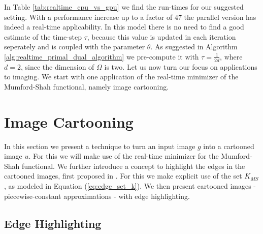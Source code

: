 \documentclass[abstracton]{scrreprt}
\begin{document}
        In Table \ref{tab:realtime_cpu_vs_gpu} we find the run-times for our suggested setting. With a performance increase up to a factor of $47$ the parallel version has indeed a real-time applicability. In this model there is no need to find a good estimate of the time-step $\tau$, because this value is updated in each iteration seperately and is coupled with the parameter $\theta$. As suggested in Algorithm \ref{alg:realtime_primal_dual_algorithm} we pre-compute it with $\tau = \frac{1}{2d}$, where $d = 2$, since the dimension of $\Omega$ is two. Let us now turn our focus on applications to imaging. We start with one application of the real-time minimizer of the Mumford-Shah functional, namely image cartooning.



    \section{Image Cartooning} %
    \label{sec:image_cartooning}
        
        In this section we present a technique to turn an input image $g$ into a cartooned image $u$. For this we will make use of the real-time minimizer for the Mumford-Shah functional. We further introduce a concept to highlight the edges in the cartooned images, first proposed in \cite{Strekalovskiy-Cremers-eccv14}. For this we make explicit use of the set $K_{MS}$, as modeled in Equation (\ref{eq:edge_set_k}). We then present cartooned images - piecewise-constant approximations - with edge highlighting.


        \subsection{Edge Highlighting} %
        \label{sub:edge_highlighting}
            
\end{document}
